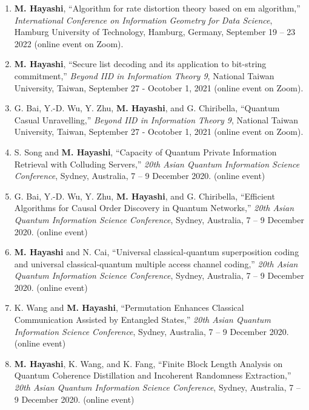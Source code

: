 \documentclass[a4paper,12pt,oneside]{article}
\begin{document}
\begin{enumerate}
\item
\textbf{M. Hayashi},
``Algorithm for rate distortion theory based on em algorithm,''
{\em International Conference on Information Geometry for Data Science},
Hamburg University of Technology, Hamburg, Germany, September 19 – 23 2022 (online event on Zoom).

\item
\textbf{M. Hayashi},
``Secure list decoding and its application to bit-string commitment,''
{\em Beyond IID in Information Theory 9},
National Taiwan University, Taiwan, September 27 - Ocotober 1, 2021 (online event on Zoom).

\item
G. Bai, Y.-D. Wu, Y. Zhu, \textbf{M. Hayashi}, and G. Chiribella,
``Quantum Casual Unravelling,''
{\em Beyond IID in Information Theory 9},
National Taiwan University, Taiwan, September 27 - Ocotober 1, 2021 (online event on Zoom).

\item
S. Song and \textbf{M. Hayashi},
``Capacity of Quantum Private Information Retrieval with Colluding Servers,''
{\em 20th Asian Quantum Information Science Conference},
Sydney, Australia, 7 -- 9 December 2020. (online event)

\item
G. Bai, Y.-D. Wu, Y. Zhu, \textbf{M. Hayashi}, and G. Chiribella,
``Efficient Algorithms for Causal Order Discovery in Quantum Networks,''
{\em 20th Asian Quantum Information Science Conference},
Sydney, Australia, 7 -- 9 December 2020. (online event)

\item
\textbf{M. Hayashi} and N. Cai,
``Universal classical-quantum superposition coding and universal classical-quantum multiple access channel coding,''
{\em 20th Asian Quantum Information Science Conference},
Sydney, Australia, 7 -- 9 December 2020. (online event)

\item
K. Wang and \textbf{M. Hayashi},
``Permutation Enhances Classical Communication Assisted by Entangled States,''
{\em 20th Asian Quantum Information Science Conference},
Sydney, Australia, 7 -- 9 December 2020. (online event)

\item
\textbf{M. Hayashi}, K. Wang, and K. Fang,
``Finite Block Length Analysis on Quantum Coherence Distillation and Incoherent Randomness Extraction,''
{\em 20th Asian Quantum Information Science Conference},
Sydney, Australia, 7 -- 9 December 2020. (online event)


\end{enumerate}
\end{document}
